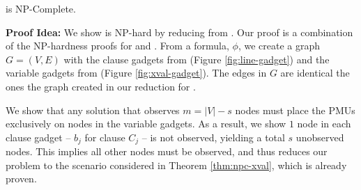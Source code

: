 

\begin{theorem}
\xvalpart is NP-Complete. %
\label{thm:npc-xvalpart}
\end{theorem}


{\bf Proof Idea:} We show \xvalpart is NP-hard by reducing from \sats. Our proof is a combination of the NP-hardness proofs for \maxinc and \xvals.
From a \sat formula, $\phi$, we create a graph $G=(V,E)$ with the clause gadgets from \maxinc (Figure \ref{fig:line-gadget}) and the variable gadgets from \xval (Figure \ref{fig:xval-gadget}).
The edges in $G$ are identical the ones the graph created in our reduction for \xvals.

We show that any solution that observes $m=|V|-s$ nodes must place the PMUs exclusively on nodes in the variable gadgets. As a result, we show
$1$ node in each clause gadget -- $b_j$ for clause $C_j$ -- is not observed, yielding a total $s$ unobserved nodes. This implies all other nodes must be
observed, and thus reduces our problem to the scenario considered in Theorem \ref{thm:npc-xval}, which is already proven.


